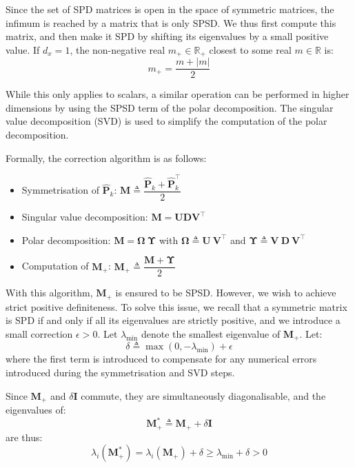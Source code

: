 Since the set of SPD matrices is open in the space of symmetric matrices, the infimum is reached by a matrix that is only SPSD. We thus first compute this matrix, and then make it SPD by shifting its eigenvalues by a small positive value. If $d_x=1$, the non-negative real $m_+\in\mathbb{R}_+$ closest to some real $m\in\mathbb{R}$ is:
\begin{equation}
	m_+=\frac{m+|m|}{2}
\end{equation}

While this only applies to scalars, a similar operation can be performed in higher dimensions by using the SPSD term of the polar decomposition. The singular value decomposition (SVD) is used to simplify the computation of the polar decomposition.

Formally, the correction algorithm \cite{bib:nearest-SPD} is as follows:
\begin{itemize}
	\item Symmetrisation of $\hat{\mathbf{P}}_k$: $\mathbf{M}\triangleq\dfrac{\hat{\mathbf{P}}_k+\hat{\mathbf{P}}_k^\top}{2}$
	\item Singular value decomposition: $\mathbf{M}=\mathbf{U}\mathbf{D}\mathbf{V}^\top$
	\item Polar decomposition: $\mathbf{M}=\boldsymbol{\Omega}\:\boldsymbol{\Upsilon}$ with $\boldsymbol{\Omega}\triangleq \mathbf{U}\:\mathbf{V}^\top$ and $\boldsymbol{\Upsilon}\triangleq \mathbf{V}\:\mathbf{D}\:\mathbf{V}^\top$
	\item Computation of $\mathbf{M}_+$: $\mathbf{M}_+\triangleq\dfrac{\mathbf{M}+\boldsymbol{\Upsilon}}{2}$
\end{itemize}

With this algorithm, $\mathbf{M}_+$ is ensured to be SPSD. However, we wish to achieve strict positive definiteness. To solve this issue, we recall that a symmetric matrix is SPD if and only if all its eigenvalues are strictly positive, and we introduce a small correction $\epsilon>0$. Let $\lambda_{\min}$ denote the smallest eigenvalue of $\mathbf{M}_+$. Let:
\begin{equation}
	\delta\triangleq\max(0,-\lambda_{\min})+\epsilon
\end{equation}
where the first term is introduced to compensate for any numerical errors introduced during the symmetrisation and SVD steps.

Since $\mathbf{M}_+$ and $\delta \mathbf{I}$ commute, they are simultaneously diagonalisable, and the eigenvalues of:
\begin{equation}
	\mathbf{M}_+^*\triangleq \mathbf{M}_++\delta \mathbf{I}
\end{equation}
are thus:
\begin{equation}
	\lambda_i(\mathbf{M}_+^*)=\lambda_i(\mathbf{M}_+)+\delta\geq\lambda_{\min}+\delta>0
\end{equation}

